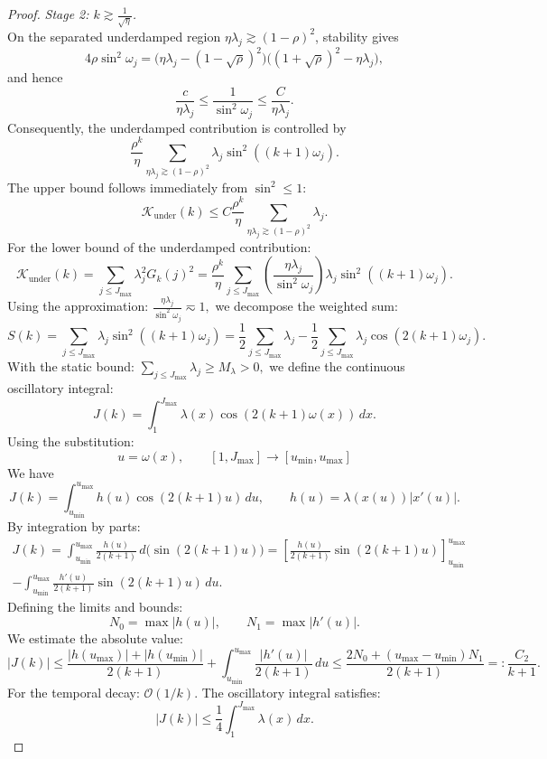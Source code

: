 \begin{proof}
\textit{Stage 2: $k \gtrsim \frac{1}{\sqrt{\eta}}$.} \\
On the separated underdamped region $\eta\lambda_j\gtrsim(1-\rho)^2$, stability gives
\[
    4\rho\sin^2\omega_j
    =\bigl(\eta\lambda_j-(1-\sqrt\rho)^2\bigr)
     \bigl((1+\sqrt\rho)^2-\eta\lambda_j\bigr),
\]
and hence
\[
    \frac{c}{\eta\lambda_j}
    \le
    \frac{1}{\sin^2\omega_j}
    \le
    \frac{C}{\eta\lambda_j}.
\]
Consequently, the underdamped contribution is controlled by
\[
    \frac{\rho^k}{\eta}
    \sum_{\eta\lambda_j\gtrsim(1-\rho)^2}
    \lambda_j\sin^2((k+1)\omega_j).
\]
The upper bound follows immediately from $\sin^2\le1$:
\[
    \mathcal K_{\mathrm{under}}(k)
    \le
    C\frac{\rho^k}{\eta}
    \sum_{\eta\lambda_j\gtrsim(1-\rho)^2}\lambda_j.
\]
For the lower bound of the underdamped contribution:
\[
    \mathcal{K}_{\mathrm{under}}(k) = \sum_{j \le J_{\max}} \lambda_j^2 G_k(j)^2 = \frac{\rho^k}{\eta} \sum_{j \le J_{\max}} \left(\frac{\eta\lambda_j}{\sin^2\omega_j}\right) \lambda_j \sin^2((k+1)\omega_j).
\]
Using the approximation:
$\frac{\eta\lambda_j}{\sin^2\omega_j} \eqsim 1,$
we decompose the weighted sum:
\[
    S(k) = \sum_{j \le J_{\max}} \lambda_j \sin^2((k+1)\omega_j) = \frac{1}{2} \sum_{j \le J_{\max}} \lambda_j - \frac{1}{2} \sum_{j \le J_{\max}} \lambda_j \cos(2(k+1)\omega_j).
\]
With the static bound:
$\sum_{j \le J_{\max}} \lambda_j \ge M_\lambda > 0,$
we define the continuous oscillatory integral:
\[
    J(k) = \int_{1}^{J_{\max}} \lambda(x) \cos(2(k+1)\omega(x)) \, dx.
\]
Using the substitution:
\[
    u = \omega(x), \qquad [1,J_{\max}] \to [u_{\min}, u_{\max}]
\]
We have
\[
    J(k) = \int_{u_{\min}}^{u_{\max}} h(u) \cos(2(k+1)u) \, du, \qquad h(u) = \lambda(x(u)) \left| x'(u) \right|.
\]
By integration by parts:
\begin{multline*}
    J(k) = \int_{u_{\min}}^{u_{\max}} \frac{h(u)}{2(k+1)} \, d\big(\sin(2(k+1)u)\big) = \left[ \frac{h(u)}{2(k+1)} \sin(2(k+1)u) \right]_{u_{\min}}^{u_{\max}}\\ - \int_{u_{\min}}^{u_{\max}} \frac{h'(u)}{2(k+1)} \sin(2(k+1)u) \, du.
\end{multline*}
Defining the limits and bounds:
\[
    N_0 = \max |h(u)|, \qquad N_1 = \max |h'(u)|.
\]
We estimate the absolute value:
\[
    |J(k)| \le \frac{|h(u_{\max})| + |h(u_{\min})|}{2(k+1)} + \int_{u_{\min}}^{u_{\max}} \frac{|h'(u)|}{2(k+1)} \, du \le \frac{2N_0 + (u_{\max} - u_{\min})N_1}{2(k+1)} =: \frac{C_2}{k+1}.
\]
For the temporal decay:
$\mathcal{O}(1/k).$
The oscillatory integral satisfies:
\[
    |J(k)| \le \frac{1}{4} \int_{1}^{J_{\max}} \lambda(x) \, dx.
\]
\end{proof}
